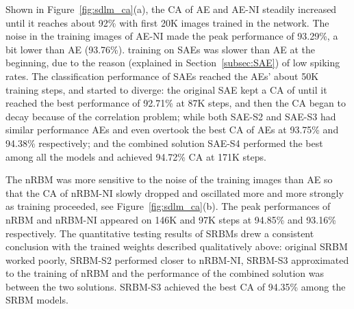 Shown in Figure~\ref{fig:sdlm_ca}(a), the CA of AE and AE-NI steadily increased until it reaches about 92\% with \protect{} first 20K images trained in the network.
The noise in the training images of AE-NI made the peak performance of 93.29\%, a bit lower than AE (93.76\%).
\protect{}
\protect{} training on SAEs was slower than \protect{} AE at the beginning, due to the reason (explained in Section~\ref{subsec:SAE}) of low spiking rates.
The classification performance of SAEs reached the AEs' \protect{} about 50K training steps, and started to diverge:
the original SAE kept a \protect{} CA \protect{} of \protect{} \protect{} until it reached the best performance of 92.71\% at 87K steps, and then the CA began to decay because of the correlation problem;
while both SAE-S2 and SAE-S3 had similar performance \protect{} \protect{} AEs and \protect{} even overtook the best CA of AEs at 93.75\% and 94.38\% respectively;
and the combined solution SAE-S4 performed the best among all the models and achieved 94.72\% CA at 171K steps.

The nRBM was more sensitive to the noise of the training images than AE so that the CA of nRBM-NI slowly dropped and oscillated more and more strongly as training proceeded, see Figure~\ref{fig:sdlm_ca}(b).
The peak performances of nRBM and nRBM-NI appeared on 146K and 97K steps at 94.85\% and 93.16\% respectively. 
The quantitative testing results of SRBMs drew a consistent conclusion with the trained weights described qualitatively above: \protect{} original SRBM worked poorly, SRBM-S2 performed closer to nRBM-NI, SRBM-S3 approximated to the training of nRBM and the performance of the combined solution was between the two solutions.
SRBM-S3 achieved the best CA of 94.35\% among the SRBM models.


